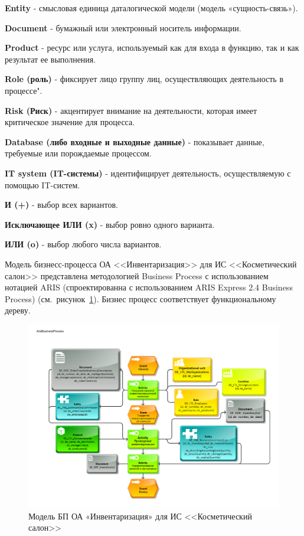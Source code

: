\textbf{Entity} - смысловая единица даталогической модели (модель «сущность-связь»).

\textbf{Document} - бумажный или электронный носитель информации.

\textbf{Product} - ресурс или услуга, используемый как для входа в функцию, так и как результат ее выполнения.

\textbf{Role (роль)} - фиксирует лицо группу лиц, осуществляющих деятельность в процессе".

\textbf{Risk (Риск)} - акцентирует внимание на деятельности, которая имеет критическое значение для процесса.

\textbf{Database (либо входные и выходные данные)} - показывает данные, требуемые или порождаемые процессом.

\textbf{IT system (IT-системы)} - идентифицирует деятельность, осуществляемую с помощью IT-систем.

\textbf{И (+)} - выбор всех вариантов.

\textbf{Исключающее ИЛИ (x)} - выбор ровно одного варианта.

\textbf{ИЛИ (o)} - выбор любого числа вариантов.

Модель бизнесс-процесса ОА <<Инвентаризация>> для ИС <<Косметический салон>> представлена методологией Business Process
с использованием нотацией ARIS (спроектированна с использованием ARIS Express 2.4 \cite{ArisExpress} Business Process) 
(см.~рисунок~\ref{fig:ARIS_BusinessProcess}).
Бизнес процесс соответствует функциональному дереву.

\begin{figure}[!h]
    \centering

    \includegraphics[width=18cm]
    {assets/ARIS/BusinessProcess/ArisBusinessProcess.pdf}

    \caption{Модель БП ОА «Инвентаризация» для ИС <<Косметический салон>>}

    \label{fig:ARIS_BusinessProcess}
\end{figure}

\newpage
